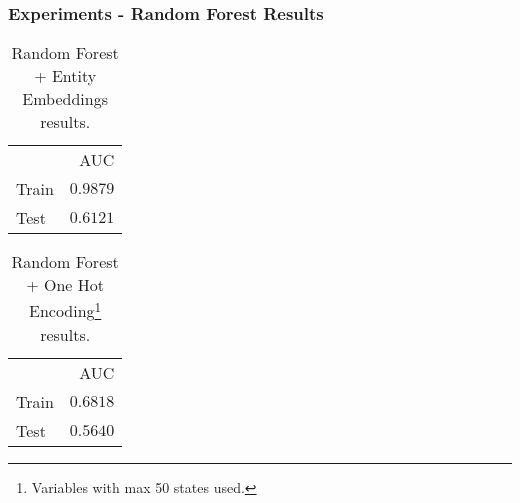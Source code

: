 \documentclass{beamer}
\begin{document}
\begin{frame}
    \frametitle{Experiments - Random Forest Results}
    \begin{table}
      \centering
      \begin{tabular}{lr}
        \toprule
        \multicolumn{2}{r}{AUC} \\
        \cmidrule(r){1-2}
        Train   & $0.9879$        \\
        Test    & $\bm{0.6121}$ \\
        \bottomrule
      \end{tabular}
      \caption{Random Forest + Entity Embeddings results.}
    \end{table}
    \begin{table}
      \centering
      \begin{tabular}{lr}
        \toprule
        \multicolumn{2}{r}{AUC} \\
        \cmidrule(r){1-2}
        Train   & $0.6818$     \\
        Test    & $\bm{0.5640}$ \\
        \bottomrule
      \end{tabular}
        \caption{Random Forest + One Hot Encoding\footnote{Variables with max 50 states used.} results.}
    \end{table}
\end{frame}
\end{document}
